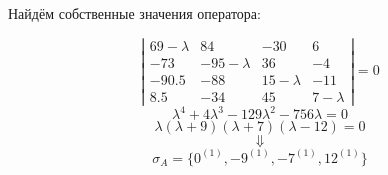 \documentclass{article}
\begin{document}
\begin{center}
Найдём собственные значения оператора:
\end{center}
$$\left|\begin{matrix}
69-\lambda & 84 & -30 & 6 \\
-73 & -95-\lambda & 36 & -4 \\
-90.5 & -88 & 15-\lambda & -11 \\
8.5 & -34 & 45 & 7-\lambda
\end{matrix}\right| = 0$$
$$\lambda^4+4\lambda^3-129\lambda^2-756\lambda = 0$$
$$\lambda(\lambda+9)(\lambda+7)(\lambda-12)=0$$
$$\Downarrow$$
$$\sigma_A = \{0^{(1)},-9^{(1)}, -7^{(1)}, 12^{(1)}\}$$
\end{document}
